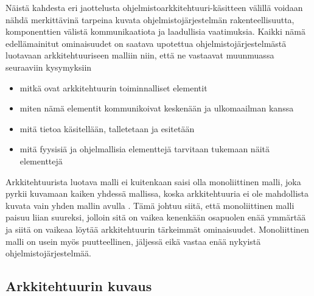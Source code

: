 \documentclass[finnish]{tktltiki2}
\theoremstyle{definition}
\theoremstyle{remark}
\begin{document}


Näistä kahdesta eri jaottelusta ohjelmistoarkkitehtuuri-käsitteen välillä voidaan nähdä merkittävinä tarpeina kuvata ohjelmistojärjestelmän rakenteellisuutta, komponenttien välistä kommunikaatiota ja laadullisia vaatimuksia. Kaikki nämä edellämainitut ominaisuudet on saatava  upotettua ohjelmistojärjestelmästä luotavaan arkkitehtuuriseen malliin niin, että ne vastaavat muunmuassa seuraaviin kysymyksiin \citep[s. 31 - 33]{Rozanski:2011:SSA:2072649} 

\begin{itemize}
	\item mitkä ovat arkkitehtuurin toiminnalliset elementit
	\item miten nämä elementit kommunikoivat keskenään ja ulkomaailman kanssa
	\item mitä tietoa käsitellään, talletetaan ja esitetään
	\item mitä fyysisiä ja ohjelmallisia elementtejä tarvitaan tukemaan näitä  elementtejä
\end{itemize}

Arkkitehtuurista luotava malli ei kuitenkaan saisi olla monoliittinen malli, joka pyrkii kuvamaan kaiken yhdessä mallissa, koska arkkitehtuuria ei ole mahdollista kuvata vain yhden mallin avulla \citep{Rozanski:2011:SSA:2072649}. Tämä johtuu siitä, että monoliittinen malli paisuu liian suureksi, jolloin sitä on vaikea kenenkään osapuolen enää ymmärtää ja siitä on vaikeaa löytää arkkitehtuurin tärkeimmät ominaisuudet. Monoliittinen malli on usein myös puutteellinen, jäljessä eikä vastaa enää nykyistä ohjelmistojärjestelmää.  


\subsection{Arkkitehtuurin kuvaus}
\end{document}
